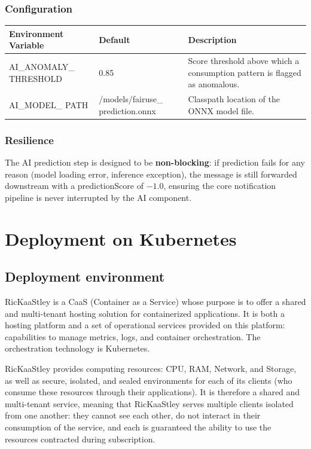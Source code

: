\subsubsection{Configuration}

\begin{center}
    \justifying
    \begin{tabularx}{\textwidth}{|p{4cm}|p{4cm}|X|}
        \hline
        \textbf{Environment Variable} & \textbf{Default} & \textbf{Description} \\
        \hline
        AI\_ANOMALY\_ THRESHOLD & 0.85 &
        Score threshold above which a consumption pattern is flagged as anomalous. \\
        \hline
        AI\_MODEL\_ PATH & /models/fairuse\_ prediction.onnx &
        Classpath location of the ONNX model file. \\
        \hline
    \end{tabularx}
    \label{tab:ai-config}
\end{center}

\subsubsection{Resilience}

The AI prediction step is designed to be \textbf{non-blocking}: if prediction fails for any reason
(model loading error, inference exception), the message is still forwarded downstream with a
predictionScore of $-1.0$, ensuring the core notification pipeline is never interrupted
by the AI component.

\section{Deployment on Kubernetes}

\subsection{Deployment environment}
RicKaaStley is a CaaS (Container as a Service) whose purpose is to offer a shared and multi-tenant hosting solution for containerized applications.
It is both a hosting platform and a set of operational services provided on this platform: capabilities to manage metrics, logs, and container orchestration.
The orchestration technology is Kubernetes.

RicKaaStley provides computing resources: CPU, RAM, Network, and Storage, as well as secure, isolated, and sealed environments for each of its clients (who consume these resources through their applications).
It is therefore a shared and multi-tenant service, meaning that RicKaaStley serves multiple clients isolated from one another: they cannot see each other, do not interact in their consumption of the service, and each is guaranteed the ability to use the resources contracted during subscription.

